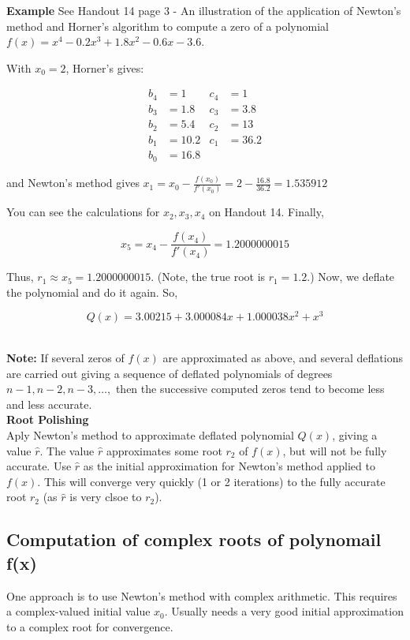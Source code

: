 \documentclass [titlepage,12pt,letter] {article}
\begin{document}
{\bf Example} See Handout 14 page 3 - An illustration of the application of Newton’s method and Horner’s algorithm
to compute a zero of a polynomial $f(x)=x^4-0.2x^3+1.8x^2-0.6x-3.6$.

With $x_0=2$, Horner's gives:

\begin{align*} 
b_4 &= 1                  &        c_4 &= 1 \\ 
b_3 &= 1.8   &        c_3 &= 3.8 \\ 
b_2 &= 5.4    &        c_2 &= 13 \\ 
b_1 &= 10.2  &        c_1 &= 36.2 \\ 
b_0 &=16.8   &  
\end{align*} 

\noindent
and Newton's method gives $x_1 = x_0 - \frac{f(x_0)}{f'(x_0)}=2-\frac{16.8}{36.2}=1.535912$

\noindent
You can see the calculations for $x_2,x_3,x_4$ on Handout 14. Finally, 

\[
x_5=x_4-\frac{f(x_4)}{f'(x_4)}=1.2000000015
\]

\noindent
Thus, $r_1 \approx x_5 = 1.2000000015$. (Note, the true root is $r_1 = 1.2$.) Now, we deflate the polynomial and do it again. So,

\[
Q(x)=3.00215+3.000084x+1.000038x^2+x^3
\]

\noindent 
\\
{\bf Note: } If several zeros of $f(x)$ are approximated as above, and several deflations are carried out giving a sequence of deflated polynomials of degrees $n-1, n-2, n-3, \dots,$ then the successive computed zeros tend to become less and less accurate. \\  
\noindent 
{\bf Root Polishing} 
\\ 
Aply Newton's method to approximate deflated polynomial $Q(x)$, giving a value $\hat r$. The value $\hat r$ approximates some root $r_2$ of $f(x)$, but will not be fully accurate. Use $\hat r$ as the initial approximation for Newton's method applied to $f(x)$. This will converge very quickly (1 or 2 iterations) to the fully accurate root $r_2$ (as $\hat r$ is very clsoe to $r_2$). 
 
 

\subsection{Computation of complex roots of polynomail f(x)} 

One approach is to use Newton's method with complex arithmetic. 
This requires a complex-valued initial value $x_0$. Usually needs a very good initial approximation to a complex root for convergence. 
\end{document}
